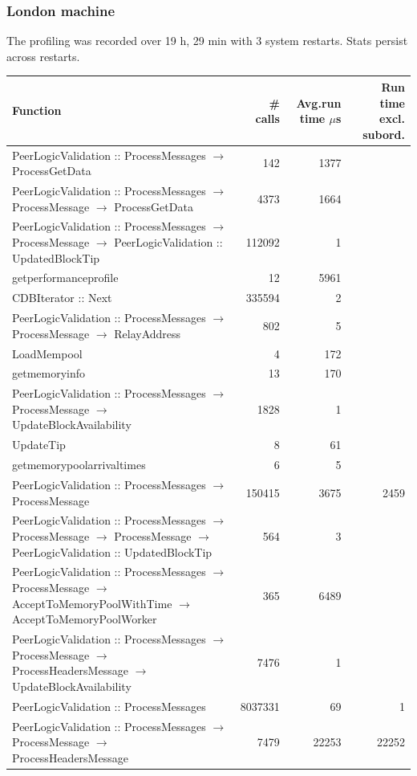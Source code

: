 \documentclass{article}
\begin{document}
\subsubsection{London machine}
The profiling was recorded over 19 h, 29 min with 3 system restarts. Stats persist across restarts.
\begin{table}
\begin{longtable}{P{8cm}|r|r|r}
	Function&\# calls& Avg.run time $\mu$s& Run time excl. subord. \\\hline
	PeerLogicValidation :: ProcessMessages $\to$ ProcessGetData& 142& 1377&\\\hline
	PeerLogicValidation :: ProcessMessages $\to$ ProcessMessage $\to$ ProcessGetData& 4373& 1664&\\\hline
	PeerLogicValidation :: ProcessMessages $\to$ ProcessMessage $\to$ PeerLogicValidation :: UpdatedBlockTip& 112092& 1&\\\hline
	getperformanceprofile& 12& 5961&\\\hline
	CDBIterator :: Next& 335594& 2&\\\hline
	PeerLogicValidation :: ProcessMessages $\to$ ProcessMessage $\to$ RelayAddress& 802& 5&\\\hline
	LoadMempool& 4& 172&\\\hline
	getmemoryinfo& 13& 170&\\\hline
	PeerLogicValidation :: ProcessMessages $\to$ ProcessMessage $\to$ UpdateBlockAvailability& 1828& 1&\\\hline
	UpdateTip& 8& 61&\\\hline
	getmemorypoolarrivaltimes& 6& 5&\\\hline
	PeerLogicValidation :: ProcessMessages $\to$ ProcessMessage& 150415& 3675&2459\\\hline
	PeerLogicValidation :: ProcessMessages $\to$ ProcessMessage $\to$ ProcessMessage $\to$ PeerLogicValidation :: UpdatedBlockTip& 564& 3&\\\hline
	PeerLogicValidation :: ProcessMessages $\to$ ProcessMessage $\to$ AcceptToMemoryPoolWithTime $\to$ AcceptToMemoryPoolWorker& 365& 6489&\\\hline
	PeerLogicValidation :: ProcessMessages $\to$ ProcessMessage $\to$ ProcessHeadersMessage $\to$ UpdateBlockAvailability& 7476& 1&\\\hline
	PeerLogicValidation :: ProcessMessages& 8037331& 69&1\\\hline
	PeerLogicValidation :: ProcessMessages $\to$ ProcessMessage $\to$ ProcessHeadersMessage& 7479& 22253&22252\\\hline

\end{longtable}
\end{table}
\end{document}
